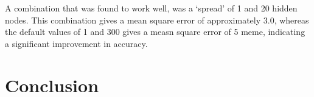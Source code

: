 A combination that was found to work well, was a `spread' of 1 and 20 hidden nodes. This combination gives a mean square error of approximately 3.0, whereas the default values of 1 and 300 gives a measn square error of 5 meme, indicating a significant improvement in accuracy.  

\section{Conclusion}









